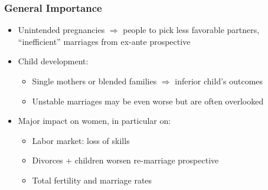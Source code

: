 \documentclass{beamer}
\begin{document}
\begin{frame}
\frametitle{General Importance}
\begin{itemize}
\item Unintended pregnancies $\Rightarrow$ people to pick less favorable partners, ``inefficient'' marriages from ex-ante prospective
\item Child development:
\begin{itemize}
\item Single mothers or blended families $\Rightarrow$ inferior child's outcomes
\item Unstable marriages may be even worse but are often overlooked
\end{itemize}
\item Major impact on women, in particular on:
\begin{itemize}
\item Labor market: loss of skills
\item Divorces + children worsen re-marriage prospective
\item Total fertility and marriage rates
\end{itemize}
\end{itemize}
\end{frame}
\end{document}

